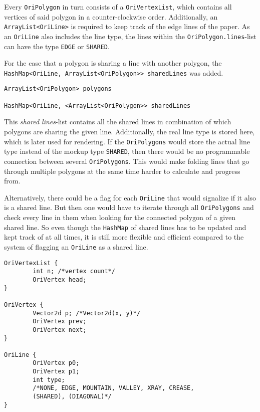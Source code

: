 \noindent Every \texttt{OriPolygon} in turn consists of a \texttt{OriVertexList}, which contains all vertices of said polygon in a counter-clockwise order. Additionally, an \texttt{ArrayList<OriLine>} is required to keep track of the edge lines of the paper. As an \texttt{OriLine} also includes the line type, the lines within the \texttt{OriPolygon.lines}-list can have the type \texttt{EDGE} or \texttt{SHARED}.

For the case that a polygon is sharing a line with another polygon, the \texttt{HashMap<OriLine, ArrayList<OriPolygon>> sharedLines} was added.

\begin{lstlisting}[label=paperModelImplementation,caption=New Implementation of Paper Model]
ArrayList<OriPolygon> polygons

HashMap<OriLine, <ArrayList<OriPolygon>> sharedLines
\end{lstlisting}

\noindent This \emph{shared lines}-list contains all the shared lines in combination of which polygons are sharing the given line. Additionally, the real line type is stored here, which is later used for rendering. If the \texttt{OriPolygons} would store the actual line type instead of the mockup type \texttt{SHARED}, then there would be no programmable connection between several \texttt{OriPolygons}. This would make folding lines that go through multiple polygons at the same time harder to calculate and progress from.

Alternatively, there could be a flag for each \texttt{OriLine} that would signalize if it also is a shared line. But then one would have to iterate through all \texttt{OriPolygons} and check every line in them when looking for the connected polygon of a given shared line. So even though the \texttt{HashMap} of shared lines has to be updated and kept track of at all times, it is still more flexible and efficient compared to the system of flagging an \texttt{OriLine} as a shared line.

\begin{lstlisting}[label=oriVertexList,caption={OriVertexList, OriVertex, and OriLine}]
OriVertexList {
        int n; /*vertex count*/
        OriVertex head;
}

OriVertex {
        Vector2d p; /*Vector2d(x, y)*/
        OriVertex prev;
        OriVertex next;
}

OriLine {
        OriVertex p0;
        OriVertex p1;
        int type; 
        /*NONE, EDGE, MOUNTAIN, VALLEY, XRAY, CREASE, 
        (SHARED), (DIAGONAL)*/
}
\end{lstlisting}

